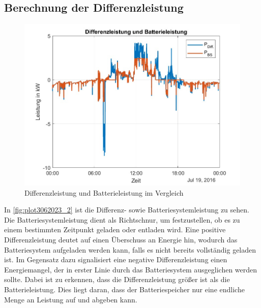\subsection{Berechnung der Differenzleistung}
\begin{figure}[H]
    \centering
    \includegraphics[width=\textwidth]{Abbildungen/plot_vorbereitungsfrage3.jpg}
    \caption{Differenzleistung und Batterieleistung im Vergleich}
    \label{fig:plot3062023_2}
\end{figure}
In \autoref{fig:plot3062023_2} ist die Differenz- sowie Batteriesystemleistung zu sehen. 
Die Batteriesystemleistung dient als Richtschnur, um festzustellen, ob es zu einem bestimmten Zeitpunkt geladen oder entladen wird. 
Eine positive Differenzleistung deutet auf einen Überschuss an Energie hin, wodurch das Batteriesystem aufgeladen werden kann, falls es nicht bereits vollständig geladen ist. Im Gegensatz dazu signalisiert eine negative Differenzleistung einen Energiemangel, der in erster Linie durch das Batteriesystem ausgeglichen werden sollte.
Dabei ist zu erkennen, dass die Differenzleistung größer ist als die Batterieleistung. 
Dies liegt daran, dass der Batteriespeicher nur eine endliche Menge an Leistung auf und abgeben kann.

